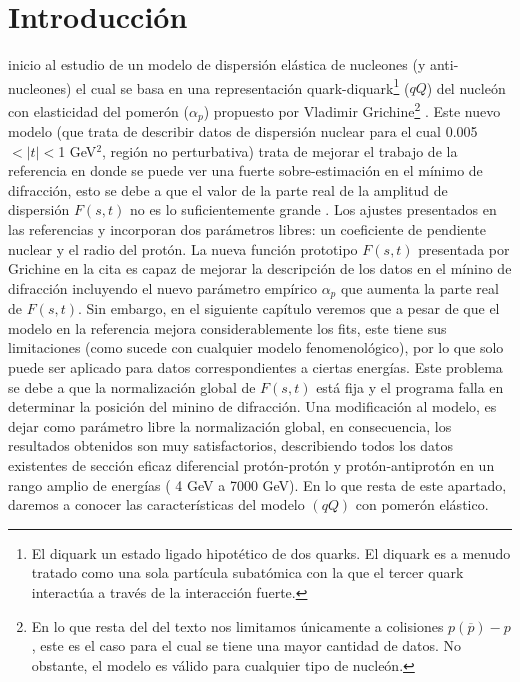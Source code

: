 \section{Introducción} 
inicio al estudio de un modelo de dispersión elástica de nucleones (y anti-nucleones) el cual se basa en una representación quark-diquark\footnote{El diquark un estado ligado hipotético de dos quarks. El diquark es a menudo tratado como una sola partícula subatómica con la que el tercer quark interactúa a través de la interacción fuerte.} ($qQ$) del nucleón con
elasticidad del pomerón ($\alpha_p$) propuesto por Vladimir Grichine\footnote{En lo que resta del del texto nos limitamos únicamente a colisiones $p(\overline{p})-p$, este es el caso para el cual se tiene una mayor cantidad de datos. No obstante, el modelo \cite{grichine} es v\'alido para cualquier tipo de nucle\'on.} . Este nuevo modelo (que trata de describir datos de dispersión nuclear para el cual 0.005$<|t|<$1 GeV$^2$, región no perturbativa) trata de mejorar el trabajo de la referencia \cite{modeloqQ}  en donde se puede ver una fuerte sobre-estimación en el mínimo de difracción, esto se debe a que el valor de la parte real de la amplitud de dispersión $F(s,t)$ no es lo suficientemente grande \cite{grichine}. Los ajustes presentados en las referencias  \cite{modeloqQ} y \cite{ivan} incorporan dos parámetros libres: un coeficiente de pendiente nuclear y el radio del prot\'on. La nueva función  prototipo $F(s,t)$ presentada por Grichine en la cita \cite{grichine} es capaz de mejorar la descripción de los datos en el m\'inino de difracción incluyendo el nuevo parámetro empírico $\alpha_p$ que aumenta la parte real de $F(s,t)$. Sin embargo, en el siguiente cap\'itulo veremos que a pesar de que el modelo en la referencia \cite{grichine} mejora considerablemente los fits, este tiene sus limitaciones (como sucede con cualquier modelo fenomenológico), por lo que solo puede ser aplicado para datos correspondientes a ciertas energías. Este problema se debe a que la normalización global de $F(s,t)$ est\'a fija y el programa falla en determinar la posición del minino de difracción. Una modificación al modelo, es dejar como parámetro libre la normalización global, en consecuencia, los resultados obtenidos son muy satisfactorios, describiendo todos los datos existentes de sección eficaz diferencial protón-protón y protón-antiprotón en un rango amplio de energías ( 4 GeV a 7000 GeV). En lo que resta de este apartado, daremos a conocer las características del modelo $(qQ)$ con pomer\'on el\'astico.
